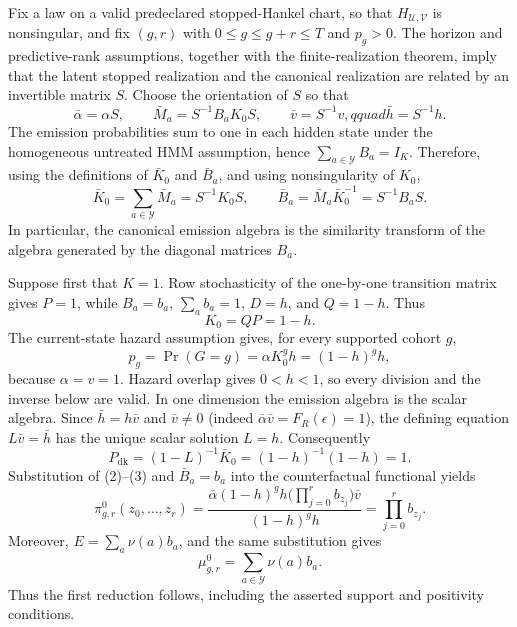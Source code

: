 Fix a law on a valid predeclared stopped-Hankel chart, so that \(H_{\mathcal U,\mathcal V}\) is nonsingular, and fix \((g,r)\) with \(0\leq g\leq g+r\leq T\) and \(p_g>0\).  The horizon and predictive-rank assumptions, together with the finite-realization theorem, imply that the latent stopped realization and the canonical realization are related by an invertible matrix \(S\).  Choose the orientation of \(S\) so that
\[
 \bar\alpha=\alpha S,\qquad
 \bar M_a=S^{-1}B_aK_0S,\qquad
 \bar v=S^{-1}v,qquad
 \bar h=S^{-1}h.
\]
The emission probabilities sum to one in each hidden state under the homogeneous untreated HMM assumption, hence \(\sum_{a\in\mathcal Y}B_a=I_K\).  Therefore, using the definitions of \(\bar K_0\) and \(\bar B_a\), and using nonsingularity of \(K_0\),
\[
 \bar K_0=\sum_{a\in\mathcal Y}\bar M_a
 =S^{-1}K_0S,
 \qquad
 \bar B_a=\bar M_a\bar K_0^{-1}=S^{-1}B_aS.                                      \tag{1}
\]
In particular, the canonical emission algebra is the similarity transform of the algebra generated by the diagonal matrices \(B_a\).

Suppose first that \(K=1\).  Row stochasticity of the one-by-one transition matrix gives \(P=1\), while \(B_a=b_a\), \(\sum_a b_a=1\), \(D=h\), and \(Q=1-h\).  Thus
\[
 K_0=QP=1-h.
\]
The current-state hazard assumption gives, for every supported cohort \(g\),
\[
 p_g=\Pr(G=g)=\alpha K_0^g h=(1-h)^g h,                                      \tag{2}
\]
because \(\alpha=v=1\).  Hazard overlap gives \(0<h<1\), so every division and the inverse below are valid.  In one dimension the emission algebra is the scalar algebra.  Since \(\bar h=h\bar v\) and \(\bar v\neq0\) (indeed \(\bar\alpha\bar v=F_R(\epsilon)=1\)), the defining equation \(L\bar v=\bar h\) has the unique scalar solution \(L=h\).  Consequently
\[
 P_{\mathrm{dk}}=(1-L)^{-1}\bar K_0=(1-h)^{-1}(1-h)=1.                         \tag{3}
\]
Substitution of (2)--(3) and \(\bar B_a=b_a\) into the counterfactual functional yields
\[
 \pi^0_{g,r}(z_0,\ldots,z_r)
 =\frac{\bar\alpha(1-h)^gh\bigl(\prod_{j=0}^r b_{z_j}\bigr)\bar v}
 {(1-h)^gh}
 =\prod_{j=0}^r b_{z_j}.                                                        \tag{4}
\]
Moreover, \(E=\sum_a\nu(a)b_a\), and the same substitution gives
\[
 \mu^0_{g,r}=\sum_{a\in\mathcal Y}\nu(a)b_a.                                  \tag{5}
\]
Thus the first reduction follows, including the asserted support and positivity conditions.

